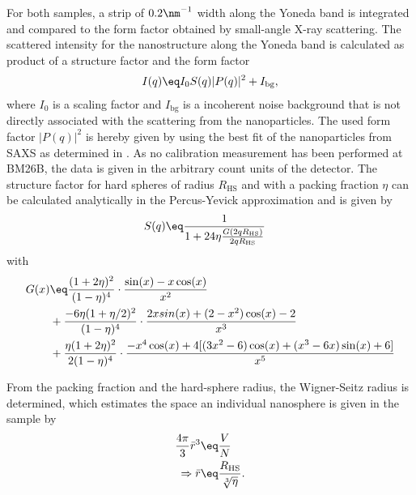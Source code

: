 \documentclass[\main/dresen_thesis.tex]{subfiles}
\begin{document}
    For both samples, a strip of $0.2 \nm^{-1}$ width along the Yoneda band is integrated and compared to the form factor obtained by small-angle X-ray scattering.
    The scattered intensity for the nanostructure along the Yoneda band is calculated as product of a structure factor and the form factor
    \begin{align}
      I(q) \eq I_0 S(q) |P(q)|^2 + I_\mathrm{bg},
    \end{align}
    where $I_0$ is a scaling factor and $I_\mathrm{bg}$ is a incoherent noise background that is not directly associated with the scattering from the nanoparticles.
    The used form factor $|P(q)|^2$ is hereby given by using the best fit of the nanoparticles from SAXS as determined in .
    As no calibration measurement has been performed at BM26B, the data is given in the arbitrary count units of the detector.
    The structure factor for hard spheres of radius $R_\mathrm{HS}$ and with a packing fraction $\eta$ can be calculated analytically in the Percus-Yevick approximation \cite{Percus_1958_Analy, Wertheim_1963_Exact, Pedersen_1997_Analy} and is given by
    \begin{align}
      S(q) &\eq \frac{1}{1 + 24 \eta \frac{G(2 q R_\mathrm{HS})}{2 q R_\mathrm{HS}} }
    \end{align}
    with
    \begin{align}
      \begin{split}
        G(x)   &\eq \frac{(1 + 2\eta )^2}{(1 - \eta )^4} \cdot \frac{ \sin(x) - x \cos(x)}{x^2}\\
               & + \frac {-6 \eta (1 + \eta / 2)^2}{(1 - \eta )^4} \cdot \frac{2 x sin(x) + (2 - x^2) \cos(x) - 2}{x^3}\\
               & + \frac{\eta (1 + 2\eta )^2}{2(1 - \eta )^4} \cdot \frac{-x^4 \cos(x) + 4 [(3 x^2 - 6) \cos(x) +(x^3 - 6 x) \sin(x) + 6]}{x^5}\\
      \end{split}
    \end{align}

    From the packing fraction and the hard-sphere radius, the Wigner-Seitz radius is determined, which estimates the space an individual nanosphere is given in the sample by
    \begin{align}
      \begin{split}
        \label{eq:looselyPackedNP:layers:wignerSeitz}
        \frac{4 \pi}{3} \bar{r}^3 &\eq \frac{V}{N}\\
        \Rightarrow \bar{r}       &\eq \frac{R_\mathrm{HS}}{\sqrt[3]{\eta}}.
      \end{split}
    \end{align}
\end{document}
